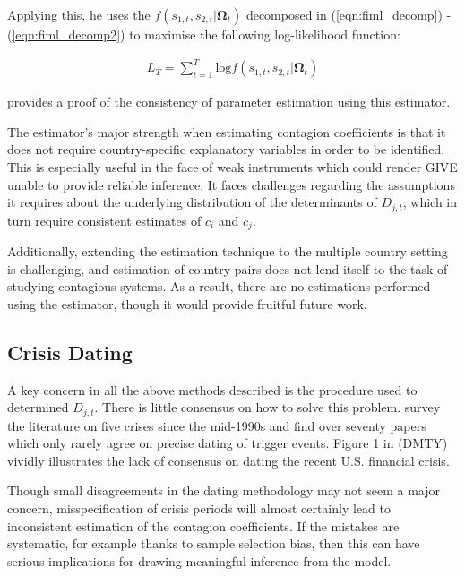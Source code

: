 \documentclass[../base.tex]{subfiles}
\begin{document}
Applying this, he uses the $f(s_{1,t}, s_{2,t} | \boldsymbol{\Omega}_t)$ decomposed in (\ref{eqn:fiml_decomp}) - (\ref{eqn:fiml_decomp2}) to maximise the following log-likelihood function:

\begin{align}
	L_T = \sum_{t=1}^{T} \text{log}f(s_{1,t}, s_{2,t} | \boldsymbol{\Omega}_t)
\end{align}

\cite{massacci2007identification} provides a proof of the consistency of parameter estimation using this estimator.

The estimator's major strength when estimating contagion coefficients is that it does not require country-specific explanatory variables in order to be identified. This is especially useful in the face of weak instruments which could render GIVE unable to provide reliable inference. It faces challenges regarding the assumptions it requires about the underlying distribution of the determinants of $D_{j,t}$, which in turn require consistent estimates of $c_i$ and $c_j$. 

Additionally, extending the estimation technique to the multiple country setting is challenging, and estimation of country-pairs does not lend itself to the task of studying contagious systems. As a result, there are no estimations performed using the estimator, though it would provide fruitful future work.

\subsection{Crisis Dating}
\label{dating_methodology}

A key concern in all the above methods described is the procedure used to determined $D_{j,t}$. There is little consensus on how to solve this problem. \cite{fry2011actually} survey the literature on five crises since the mid-1990s and find over seventy papers which only rarely agree on precise dating of trigger events. Figure 1 in  \cite{dungey2015endogenous} (DMTY) vividly illustrates the lack of consensus on dating the recent U.S. financial crisis.

Though small disagreements in the dating methodology may not seem a major concern, misspecification of crisis periods will almost certainly lead to inconsistent estimation of the contagion coefficients. If the mistakes are systematic, for example thanks to sample selection bias, then this can have serious implications for drawing meaningful inference from the model. 
\end{document}
